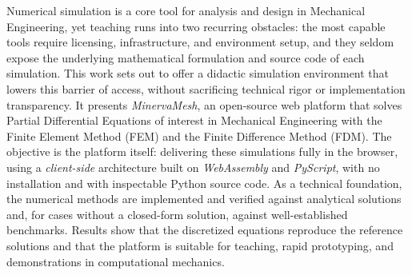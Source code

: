 \begin{foreignabstract}

Numerical simulation is a core tool for analysis and design in Mechanical Engineering, yet teaching runs into two recurring obstacles: the most capable tools require licensing, infrastructure, and environment setup, and they seldom expose the underlying mathematical formulation and source code of each simulation. This work sets out to offer a didactic simulation environment that lowers this barrier of access, without sacrificing technical rigor or implementation transparency. It presents \textit{MinervaMesh}, an open-source web platform that solves Partial Differential Equations of interest in Mechanical Engineering with the Finite Element Method (FEM) and the Finite Difference Method (FDM). The objective is the platform itself: delivering these simulations fully in the browser, using a \textit{client-side} architecture built on \textit{WebAssembly} and \textit{PyScript}, with no installation and with inspectable Python source code. As a technical foundation, the numerical methods are implemented and verified against analytical solutions and, for cases without a closed-form solution, against well-established benchmarks. Results show that the discretized equations reproduce the reference solutions and that the platform is suitable for teaching, rapid prototyping, and demonstrations in computational mechanics.

\end{foreignabstract}
